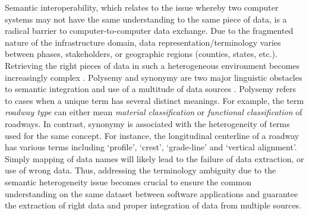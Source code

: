 \documentclass[Journal,InsideFigs, DoubleSpace]{ascelike} %
\begin{document}
\par
Semantic interoperability, which relates to the issue whereby two computer systems may not have the same understanding to the same piece of data, is a radical barrier to computer-to-computer data exchange. Due to the fragmented nature of the infrastructure domain, data representation/terminology varies between phases, stakeholders, or geographic regions (counties, states, etc.). Retrieving the right pieces of data in such a heterogeneous environment becomes increasingly complex \cite{karimi2003semantic}. Polysemy and synonymy are two major linguistic obstacles to semantic integration and use of a multitude of data sources \cite{noy04}. Polysemy refers to cases when a unique term has several distinct meanings. For example, the term \textit{roadway type} can either mean \textit{material classification} or \textit{functional classification} of roadways. In contrast, synonymy is associated with the heterogeneity of terms used for the same concept. For instance, the longitudinal centerline of a roadway has various terms including `profile', `crest', `grade-line' and `vertical alignment'. Simply mapping of data names will likely lead to the failure of data extraction, or use of wrong data. Thus, addressing the terminology ambiguity due to the semantic heterogeneity issue becomes crucial to ensure the common understanding on the same dataset between software applications and guarantee the extraction of right data and proper integration of data from multiple sources. 
\par
\end{document}
